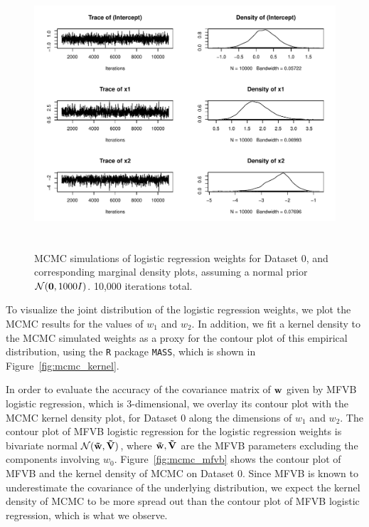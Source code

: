 \begin{figure}
\centering
	\includegraphics[height=100mm]{figures/mcmc_normal.pdf}
    \caption{MCMC simulations of logistic regression weights for Dataset 0, and corresponding marginal density plots, assuming 
    a normal prior $\mathcal{N}(\boldsymbol{\mathbf{0}},1000I)$. 10,000 iterations total.}  \label{fig:mcmc_iterations_normal}  
\end{figure}

To visualize the joint distribution of the logistic regression weights, we plot the MCMC results for the values of $w_1$ and $w_2$.  In addition, we fit a kernel density to the MCMC simulated weights as a proxy for the contour plot of this empirical distribution, using the \texttt{R} package \texttt{MASS}, which is shown in Figure~\ref{fig:mcmc_kernel}.  

In order to evaluate the accuracy of the covariance matrix of $\boldsymbol{\mathbf{w}}$ given by MFVB logistic regression, which is 3-dimensional, we overlay its contour plot with the MCMC kernel density plot, for Dataset 0 along the dimensions of $w_1$ and $w_2$.  The contour plot of MFVB logistic regression for the logistic regression weights is bivariate normal $\mathcal{N}(\boldsymbol{\mathbf{\tilde w}},\boldsymbol{\mathbf{\tilde V}})$, where $\boldsymbol{\mathbf{\tilde w}},\boldsymbol{\mathbf{\tilde V}}$ are the MFVB parameters excluding the components involving $w_0$.  Figure~\ref{fig:mcmc_mfvb} shows the contour plot of MFVB and the kernel density of MCMC on Dataset 0.  Since MFVB is known to underestimate the covariance of the underlying distribution, we expect the kernel density of MCMC to be more spread out than the contour plot of MFVB logistic regression, which is what we observe.  

